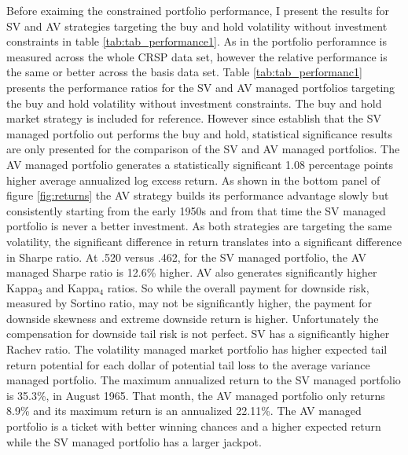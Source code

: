 Before exaiming the constrained portfolio performance, I present the results for SV and AV strategies targeting the buy and hold volatility without investment constraints in table \ref{tab:tab_performance1}. As in \citet{moreira_volatility-managed_2017} the portfolio perforamnce is measured across the whole CRSP data set, however the relative performance is the same or better across the basis data set. Table \ref{tab:tab_performanc1} presents the performance ratios for the SV and AV managed portfolios targeting the buy and hold volatility without investment constraints. The buy and hold market strategy is included for reference. However since \citet{moreira_volatility-managed_2017} establish that the SV managed portfolio out performs the buy and hold, statistical significance results are only presented for the comparison of the SV and AV managed portfolios. The AV managed portfolio generates a statistically significant 1.08 percentage points higher average annualized log excess return. As shown in the bottom panel of figure \ref{fig:returns} the AV strategy builds its performance advantage slowly but consistently starting from the early 1950s and from that time the SV managed portfolio is never a better investment. As both strategies are targeting the same volatility, the significant difference in return translates into a significant difference in Sharpe ratio. At .520 versus .462, for the SV managed portfolio, the AV managed Sharpe ratio is 12.6\% higher. AV also generates significantly higher Kappa$_{3}$ and Kappa$_{4}$ ratios. So while the overall payment for downside risk, measured by Sortino ratio, may not be significantly higher, the payment for downside skewness and extreme downside return is higher. Unfortunately the compensation for downside tail risk is not perfect. SV has a significantly higher Rachev ratio. The volatility managed market portfolio has higher expected tail return potential for each dollar of potential tail loss to the average variance managed portfolio. The maximum annualized return to the SV managed portfolio is 35.3\%, in August 1965. That month, the AV managed portfolio only returns 8.9\% and its maximum return is an annualized 22.11\%. The AV managed portfolio is a ticket with better winning chances and a higher expected return while the SV managed portfolio has a larger jackpot.

